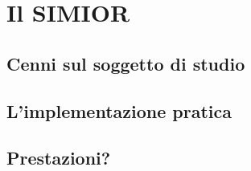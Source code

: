 \chapter{Il SIMIOR}

\section{Cenni sul soggetto di studio}
\section{L'implementazione pratica}
\section{Prestazioni?}